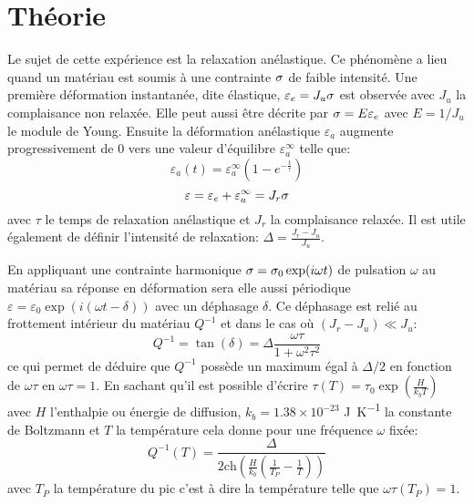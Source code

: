 \section{Théorie}

Le sujet de cette expérience est la relaxation anélastique. Ce phénomène a lieu quand un matériau est soumis à une contrainte $\sigma$ de faible intensité. Une première déformation instantanée, dite élastique, $\varepsilon_e = J_u \sigma$ est observée avec $J_u$ la complaisance non relaxée. Elle peut aussi être décrite par $\sigma = E\varepsilon_e$ avec $E = 1/J_u$ le module de Young. Ensuite la déformation anélastique $\varepsilon_a$ augmente progressivement de $0$ vers une valeur d'équilibre $\varepsilon_a^\infty$ telle que:
\begin{equation}
    \varepsilon_a(t) = \varepsilon_a^\infty \left(1-e^{-\frac{t}{\tau}}\right)
\end{equation}
\begin{equation}
    \varepsilon = \varepsilon_e + \varepsilon_a^\infty = J_r \sigma
\end{equation}
avec $\tau$ le temps de relaxation anélastique et $J_r$ la complaisance relaxée. Il est utile également de définir l'intensité de relaxation: $\Delta = \frac{J_r - J_u}{J_u}$.

En appliquant une contrainte harmonique $\sigma = \sigma_0 \exp(i\omega t)$ de pulsation $\omega$ au matériau sa réponse en déformation sera elle aussi périodique $\varepsilon = \varepsilon_0\exp(i(\omega t - \delta))$ avec un déphasage $\delta$. Ce déphasage est relié au frottement intérieur du matériau $Q^{-1}$ et dans le cas où $(J_r - J_u) \ll J_u$:
\begin{equation}
    Q^{-1} = \tan(\delta) = \Delta\frac{\omega\tau}{1+\omega^2\tau^2}
\end{equation}
ce qui permet de déduire que $Q^{-1}$ possède un maximum égal à $\Delta/2$ en fonction de $\omega\tau$ en $\omega\tau = 1$. En sachant qu'il est possible d'écrire $\tau(T) = \tau_0 \exp(\frac{H}{k_bT})$ avec $H$ l'enthalpie ou énergie de diffusion, $k_b = 1.38 \times 10^{-23}$ \si{\joule \per \kelvin} la constante de Boltzmann et $T$ la température cela donne pour une fréquence $\omega$ fixée:
\begin{equation}
    Q^{-1}(T) = \frac{\Delta}{2 \mathrm{ch}\left(\frac{H}{k_b}\left(\frac{1}{T_P}-\frac{1}{T}\right)\right)}
    \label{eq:Q_inv_T}
\end{equation}
avec $T_P$ la température du pic c'est à dire la température telle que $\omega\tau(T_P) = 1$.

